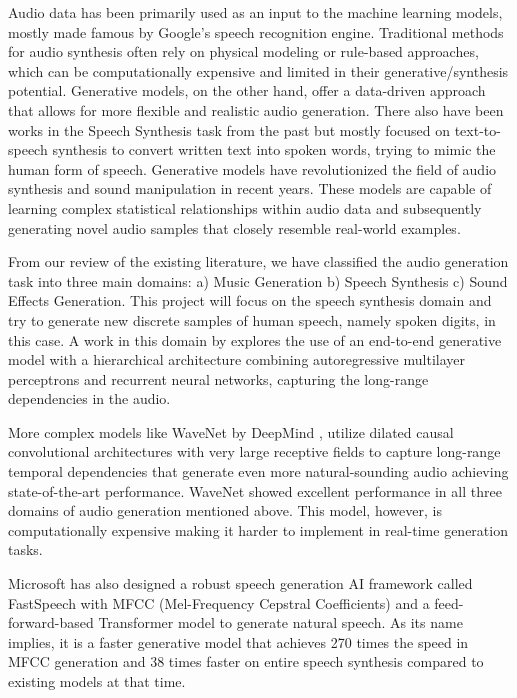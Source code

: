 \documentclass[12pt]{article}
\begin{document}
Audio data has been primarily used as an input to the machine learning models, mostly made famous by Google’s speech recognition engine. Traditional methods for audio synthesis often rely on physical modeling or rule-based approaches, which can be computationally expensive and limited in their generative/synthesis potential. Generative models, on the other hand, offer a data-driven approach that allows for more flexible and realistic audio generation. There also have been works in the Speech Synthesis task from the past but mostly focused on text-to-speech synthesis to convert written text into spoken words, trying to mimic the human form of speech. Generative models have revolutionized the field of audio synthesis and sound manipulation in recent years. These models are capable of learning complex statistical relationships within audio data and subsequently generating novel audio samples that closely resemble real-world examples. \cite{Natsiou2021Audio}

From our review of the existing literature, we have classified the audio generation task into three main domains: a) Music Generation b) Speech Synthesis c) Sound Effects Generation. This project will focus on the speech synthesis domain and try to generate new discrete samples of human speech, namely spoken digits, in this case. A work in this domain by \cite{Becker2018Interpreting} explores the use of an end-to-end generative model with a hierarchical architecture combining autoregressive multilayer perceptrons and recurrent neural networks, capturing the long-range dependencies in the audio.

More complex models like WaveNet by DeepMind \cite{Oord2016WaveNet}, utilize dilated causal convolutional architectures with very large receptive fields to capture long-range temporal dependencies that generate even more natural-sounding audio achieving state-of-the-art performance. WaveNet showed excellent performance in all three domains of audio generation mentioned above. This model, however, is computationally expensive making it harder to implement in real-time generation tasks.

Microsoft has also designed a robust speech generation AI framework called FastSpeech with MFCC (Mel-Frequency Cepstral Coefficients) and a feed-forward-based Transformer model to generate natural speech. As its name implies, it is a faster generative model that achieves 270 times the speed in MFCC generation and 38 times faster on entire speech synthesis compared to existing models at that time.\cite{Ren2019FastSpeech}
\end{document}
